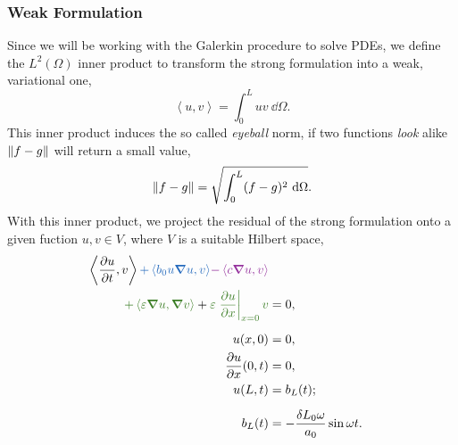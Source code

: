 \documentclass[../../thesis.tex]{subfiles}
\newcommand{\inner}[2]{\left<#1, #2\right>}
\begin{document}
\subsubsection{Weak Formulation}
Since we will be working with the Galerkin procedure to solve PDEs, 
we define the $L^2(\Omega)$ inner product to transform the strong formulation into a weak, variational one,
\begin{equation}
    \inner{u}{v} = \int_0^L uv\ \dd\Omega.
\end{equation}
This inner product induces the so called \emph{eyeball} norm, 
if two functions \textit{look} alike $\norm{f-g}$ will return a small value,
\begin{equation}
    \norm{f-g}  = \sqrt{\int_0^L (f - g)^2\ \dd\Omega}.
\end{equation}
With this inner product, we project the residual of the strong formulation onto a given fuction 
$u, v \in V$,
where $V$ is a suitable Hilbert space,
\begin{subequations}
    \begin{align}
        \label{eq:1d_fom_weak_formulation}
        \inner{\frac{\partial u}{\partial t}}{v} 
        \textcolor{NavyBlue}{+ \inner{b_0 u \grad u}{v}}
        \textcolor{Purple}{- \inner{c \grad u}{v}} 
        \nonumber \\ 
        \textcolor{OliveGreen}{+ \inner{\varepsilon \grad u}{\grad v}} 
        + \textcolor{OliveGreen}{\varepsilon \left.\pdv{u}{x}\right|_{x=0} v}
        &= 0,  
        \\[2mm]
        u(x, 0) &= 0, 
        \\
        \pdv{u}{x} \qty(0, t) &= 0,
        \\
        u(L, t) &= b_L(t);
        \\[2mm]
        b_L(t) &= - \frac{\delta L_0 \omega}{a_0} \sin \omega t.
    \end{align}
\end{subequations}
\end{document}
